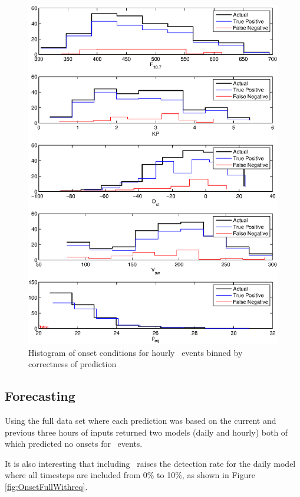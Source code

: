 \begin{figure}[htp!]
	\centering
	\includegraphics[width=1\linewidth]{Figures/CH5/NNBinaryOnset-hourly-withreq-hist.eps}
	\caption{Histogram of onset conditions for hourly \req\ events binned by correctness of prediction}
	\label{fig:OnsetWithreq-hist}
\end{figure}

\subsection{Forecasting}

Using the full data set where each prediction was based on the current and previous three hours of inputs returned two models (daily and hourly) both of which predicted no onsets for \req\ events.



It is also interesting that including \req\ raises the detection rate for the daily model where all timesteps are included from 0\% to 10\%, as shown in Figure \ref{fig:OnsetFullWithreq}.

